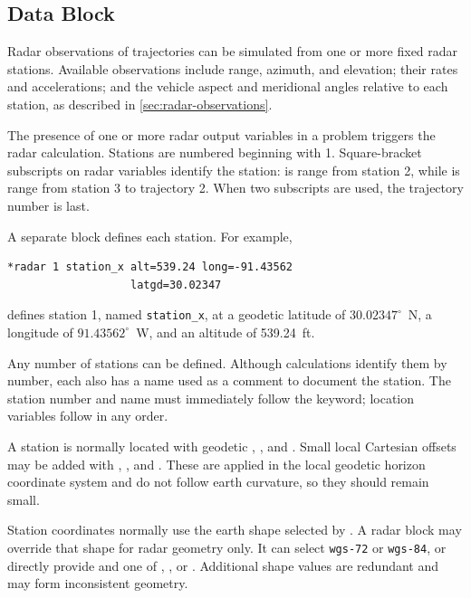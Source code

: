 \subsection{ Data Block}\label{sec:block-radar}

Radar observations of trajectories can be simulated from one or more fixed radar
stations. Available observations include range, azimuth, and elevation; their rates and
accelerations; and the vehicle aspect and meridional angles relative to each station,
as described in \cref{sec:radar-observations}.

The presence of one or more radar output variables in a problem triggers the radar
calculation. Stations are numbered beginning with 1. Square-bracket subscripts on
radar variables identify the station:  is range from station 2,
while  is range from station 3 to trajectory 2. When two
subscripts are used, the trajectory number is last.

A separate  block defines each station. For example,

\begin{lstlisting}[style=taosmanual]
*radar 1 station_x alt=539.24 long=-91.43562
                   latgd=30.02347
\end{lstlisting}

defines station 1, named \texttt{station\_x}, at a geodetic latitude of
$30.02347^\circ$~N, a longitude of $91.43562^\circ$~W, and an altitude of
539.24~ft.

Any number of stations can be defined. Although calculations identify them by
number, each also has a name used as a comment to document the station. The station
number and name must immediately follow the  keyword;
location variables follow in any order.

A station is normally located with geodetic , , and
. Small local Cartesian offsets may be added with
, , and . These are applied in
the local geodetic horizon coordinate system and do not follow earth curvature, so
they should remain small.

Station coordinates normally use the earth shape selected by
. A radar block may override that shape for radar geometry
only. It can select \texttt{wgs-72} or \texttt{wgs-84}, or directly provide
 and one of , , or
. Additional shape values are redundant and may form inconsistent
geometry.

